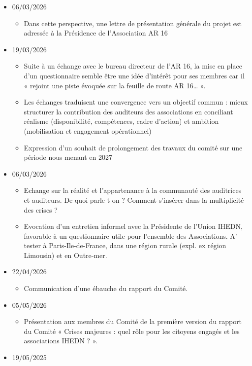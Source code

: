 \documentclass[10pt,a4paper]{article}
\begin{document}
\begin{itemize}
\begin{itemize}
\end{itemize}
\item 06/03/2026
\begin{itemize}
\item Dans cette perspective, une lettre de présentation générale du projet est adressée à la Présidence de l'Association AR 16 
\end{itemize}
\item 19/03/2026
\begin{itemize}
\item Suite à un échange avec le bureau directeur de l'AR 16, la mise en place d'un questionnaire semble être une idée d'intérêt pour ses membres car il « rejoint une piste évoquée sur la feuille de route AR 16… ».
\item Les échanges traduisent une convergence vers un objectif commun : mieux structurer la contribution des auditeurs des associations en conciliant réalisme (disponibilité, compétences, cadre d'action) et ambition (mobilisation et engagement opérationnel)
\item Expression d'un souhait de prolongement des travaux du comité sur une période nous menant en 2027
\end{itemize}
\item 06/03/2026
\begin{itemize}
\item Echange sur la réalité et l'appartenance à la communauté des auditrices et auditeurs. De quoi parle-t-on ? Comment s'insérer dans la multiplicité des crises ?
\item Evocation d'un entretien informel avec la Présidente de l'Union IHEDN, favorable à un questionnaire utile pour l'ensemble des Associations. A' tester à Paris-Ile-de-France, dans une région rurale (expl. ex région Limousin) et en Outre-mer.
\end{itemize}
\item 22/04/2026
\begin{itemize}
\item Communication d'une ébauche du rapport du Comité.
\end{itemize}
\item 05/05/2026
\begin{itemize}
\item Présentation aux membres du Comité de la première version du rapport du Comité « Crises majeures : quel rôle pour les citoyens engagés et les associations IHEDN ? ».
\end{itemize}
\item 19/05/2025

\end{itemize}
\end{document}
